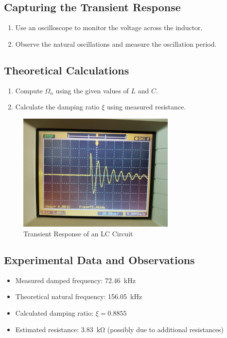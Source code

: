 \documentclass[a4paper,12pt]{article}
\begin{document}
\subsection{Capturing the Transient Response}
\begin{enumerate}
    \item Use an oscilloscope to monitor the voltage across the inductor.
    \item Observe the natural oscillations and measure the oscillation period.
\end{enumerate}

\subsection{Theoretical Calculations}
\begin{enumerate}
    \item Compute \(\Omega_n\) using the given values of \(L\) and \(C\).
    \item Calculate the damping ratio \(\xi\) using measured resistance.
\end{enumerate}
\begin{figure}[H]
    \centering
    \includegraphics[width=0.7\textwidth]{figs/plot.jpeg}
    \caption{Transient Response of an LC Circuit}
\end{figure}

\subsection{Experimental Data and Observations}
\begin{itemize}
    \item Measured damped frequency: \SI{72.46}{\kilo\hertz}
    \item Theoretical natural frequency: \SI{156.05}{\kilo\hertz}
    \item Calculated damping ratio: \(\xi = 0.8855\)
    \item Estimated resistance: \SI{3.83}{\kilo\ohm} (possibly due to additional resistances)
\end{itemize}
\end{document}

